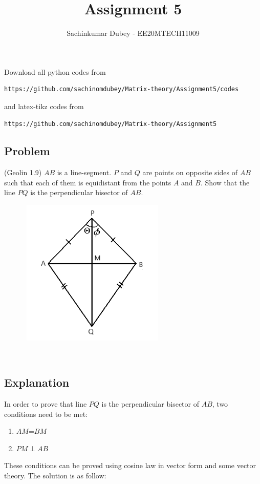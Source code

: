 \documentclass[journal,12pt,twocolumn]{IEEEtran}
\begin{document}
\def\putbox#1#2#3{\makebox[0in][l]{\makebox[#1][l]{}\raisebox{\baselineskip}[0in][0in]{\raisebox{#2}[0in][0in]{#3}}}}
     \def\rightbox#1{\makebox[0in][r]{#1}}
     \def\centbox#1{\makebox[0in]{#1}}
     \def\topbox#1{\raisebox{-\baselineskip}[0in][0in]{#1}}
     \def\midbox#1{\raisebox{-0.5\baselineskip}[0in][0in]{#1}}
\vspace{3cm}
\title{Assignment 5}
\author{Sachinkumar Dubey - EE20MTECH11009}

\maketitle
\newpage
\bigskip
\renewcommand{\thefigure}{\theenumi}
\renewcommand{\thetable}{\theenumi}
Download all python codes from 
\begin{lstlisting}
https://github.com/sachinomdubey/Matrix-theory/Assignment5/codes
\end{lstlisting}
%
and latex-tikz codes from 
%
\begin{lstlisting}
https://github.com/sachinomdubey/Matrix-theory/Assignment5
\end{lstlisting}
\subsection{Problem}
(Geolin 1.9) $AB$ is a line-segment. $P$ and $Q$ are points on opposite sides of $AB$ such that each of them is equidistant from the points $A$ and $B$. Show that the line $PQ $ is the perpendicular bisector of $AB$.
\\
\begin{figure}[h!]
\centering
\includegraphics[width=7cm, height=7cm]{Figure_51}
\caption{}
\label{Fig4}
\end{figure}
\\
\subsection{Explanation}
In order to prove that line $PQ $ is the perpendicular bisector of $AB$, two conditions need to be met:
\begin{enumerate}
    \item $AM$=$BM$
    \item $PM \perp AB $
\end{enumerate}
These conditions can be proved using cosine law in vector form and some vector theory. The solution is as follow:
\end{document}
